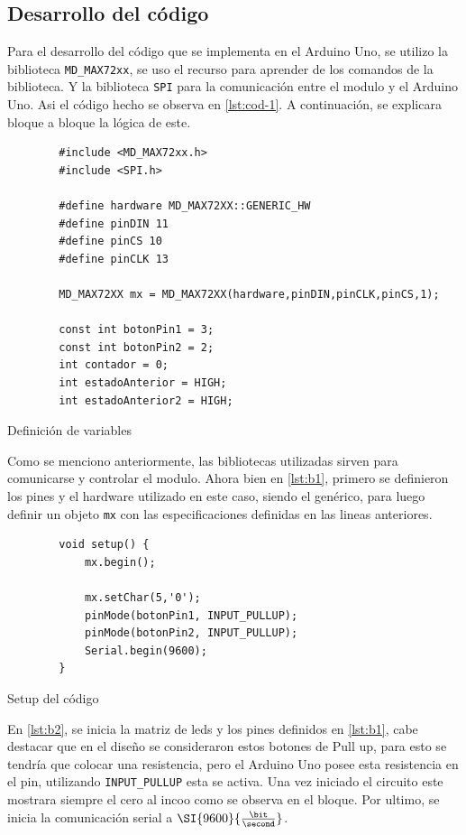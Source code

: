 \subsection{Desarrollo del código}
Para el desarrollo del código que se implementa en el Arduino Uno, se utilizo la biblioteca \texttt{MD\_MAX72xx}, se uso
el recurso \cite{programarfacilMax7219} para aprender de los comandos de la biblioteca. Y la biblioteca \texttt{SPI} para 
la comunicación entre el modulo y el Arduino Uno. Asi el código hecho se observa en \autoref{lst:cod-1}. A continuación, se explicara 
bloque a bloque la lógica de este.
\clearpage
\begin{listing}[H]
    \begin{verbatim}
        #include <MD_MAX72xx.h>
        #include <SPI.h>

        #define hardware MD_MAX72XX::GENERIC_HW
        #define pinDIN 11
        #define pinCS 10
        #define pinCLK 13

        MD_MAX72XX mx = MD_MAX72XX(hardware,pinDIN,pinCLK,pinCS,1);

        const int botonPin1 = 3;  
        const int botonPin2 = 2;
        int contador = 0;         
        int estadoAnterior = HIGH; 
        int estadoAnterior2 = HIGH;
    \end{verbatim}
    \caption{Definición de variables}
    \label{lst:b1}
\end{listing}

Como se menciono anteriormente, las bibliotecas utilizadas sirven para comunicarse y controlar el modulo. Ahora bien en \autoref{lst:b1},
primero se definieron los pines y el hardware utilizado en este caso, siendo el genérico, para luego definir un objeto
\texttt{mx} con las especificaciones definidas en las lineas anteriores.   

\begin{listing}[H]
    \begin{verbatim}
        void setup() {
            mx.begin();

            mx.setChar(5,'0');
            pinMode(botonPin1, INPUT_PULLUP); 
            pinMode(botonPin2, INPUT_PULLUP);
            Serial.begin(9600);
        }
    \end{verbatim}
    \caption{Setup del código}
    \label{lst:b2}
\end{listing}
En \autoref{lst:b2}, se inicia la matriz de leds y los pines definidos en \autoref{lst:b1}, cabe destacar que en el diseño se consideraron estos botones
de Pull up, para esto se tendría que colocar una resistencia, pero el Arduino Uno posee esta resistencia en el pin, utilizando \texttt{INPUT\_PULLUP} esta se activa.
Una vez iniciado el circuito este mostrara siempre el cero al incoo como se observa en el bloque. Por ultimo, se inicia la comunicación
serial a $\SI{9600}{\frac{\bit}{\second}}$.

